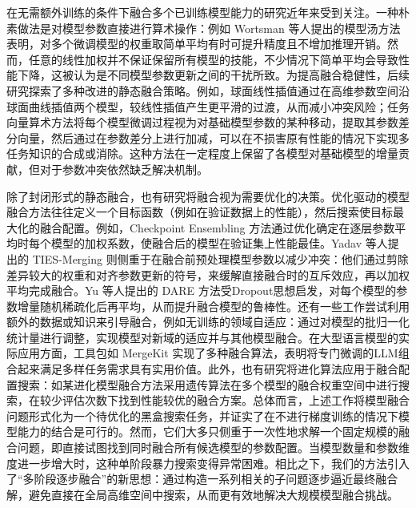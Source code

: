 \documentclass[../main.tex]{subfiles}
\begin{document}
\label{sec:ch5-2-problem-background-and-basics}

\label{sec:ch5-2-1-model-fusion-and-ensemble}
在无需额外训练的条件下融合多个已训练模型能力的研究近年来受到关注。一种朴素做法是对模型参数直接进行算术操作：例如 Wortsman 等人提出的模型汤方法表明，对多个微调模型的权重取简单平均有时可提升精度且不增加推理开销。然而，任意的线性加权并不保证保留所有模型的技能，不少情况下简单平均会导致性能下降，这被认为是不同模型参数更新之间的干扰所致。为提高融合稳健性，后续研究探索了多种改进的静态融合策略。例如，球面线性插值通过在高维参数空间沿球面曲线插值两个模型，较线性插值产生更平滑的过渡，从而减小冲突风险；任务向量算术方法将每个模型微调过程视为对基础模型参数的某种移动，提取其参数差分向量，然后通过在参数差分上进行加减，可以在不损害原有性能的情况下实现多任务知识的合成或消除。这种方法在一定程度上保留了各模型对基础模型的增量贡献，但对于参数冲突依然缺乏解决机制。

除了封闭形式的静态融合，也有研究将融合视为需要优化的决策。优化驱动的模型融合方法往往定义一个目标函数（例如在验证数据上的性能），然后搜索使目标最大化的融合配置。例如，Checkpoint Ensembling 方法通过优化确定在逐层参数平均时每个模型的加权系数，使融合后的模型在验证集上性能最佳。Yadav 等人提出的 TIES-Merging 则侧重于在融合前预处理模型参数以减少冲突：他们通过剪除差异较大的权重和对齐参数更新的符号，来缓解直接融合时的互斥效应，再以加权平均完成融合。Yu 等人提出的 DARE 方法受Dropout思想启发，对每个模型的参数增量随机稀疏化后再平均，从而提升融合模型的鲁棒性。还有一些工作尝试利用额外的数据或知识来引导融合，例如无训练的领域自适应：通过对模型的批归一化统计量进行调整，实现模型对新域的适应并与其他模型融合。在大型语言模型的实际应用方面，工具包如 MergeKit 实现了多种融合算法，表明将专门微调的LLM组合起来满足多样任务需求具有实用价值。此外，也有研究将进化算法应用于融合配置搜索：如某进化模型融合方法采用遗传算法在多个模型的融合权重空间中进行搜索，在较少评估次数下找到性能较优的融合方案。总体而言，上述工作将模型融合问题形式化为一个待优化的黑盒搜索任务，并证实了在不进行梯度训练的情况下模型能力的结合是可行的。然而，它们大多只侧重于一次性地求解一个固定规模的融合问题，即直接试图找到同时融合所有候选模型的参数配置。当模型数量和参数维度进一步增大时，这种单阶段暴力搜索变得异常困难。相比之下，我们的方法引入了“多阶段逐步融合”的新思想：通过构造一系列相关的子问题逐步逼近最终融合解，避免直接在全局高维空间中搜索，从而更有效地解决大规模模型融合挑战。
\end{document}
